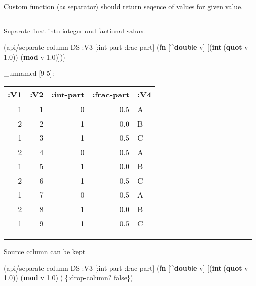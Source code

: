 \documentclass[]{article}
\newenvironment{Shaded}{\begin{snugshade}}{\end{snugshade}}
\newcommand{\KeywordTok}[1]{\textcolor[rgb]{0.13,0.29,0.53}{\textbf{#1}}}
\newcommand{\FloatTok}[1]{\textcolor[rgb]{0.00,0.00,0.81}{#1}}
\newcommand{\VariableTok}[1]{\textcolor[rgb]{0.00,0.00,0.00}{#1}}
\newcommand{\AttributeTok}[1]{\textcolor[rgb]{0.77,0.63,0.00}{#1}}
\newcommand{\NormalTok}[1]{#1}
\begin{document}
Custom function (as separator) should return seqence of values for given
value.

\begin{center}\rule{0.5\linewidth}{0.5pt}\end{center}

Separate float into integer and factional values

\begin{Shaded}
\begin{Highlighting}[]
\NormalTok{(api/separate-column DS }\AttributeTok{:V3}\NormalTok{ [}\AttributeTok{:int-part} \AttributeTok{:frac-part}\NormalTok{] (}\KeywordTok{fn}\NormalTok{ [^}\KeywordTok{double}\NormalTok{ v]}
\NormalTok{                                                     [(}\KeywordTok{int}\NormalTok{ (}\KeywordTok{quot}\NormalTok{ v }\FloatTok{1.0}\NormalTok{))}
\NormalTok{                                                      (}\KeywordTok{mod}\NormalTok{ v }\FloatTok{1.0}\NormalTok{)]))}
\end{Highlighting}
\end{Shaded}

\_unnamed {[}9 5{]}:

\begin{longtable}[]{@{}rrrrl@{}}
\toprule
:V1 & :V2 & :int-part & :frac-part & :V4\tabularnewline
\midrule
\endhead
1 & 1 & 0 & 0.5 & A\tabularnewline
2 & 2 & 1 & 0.0 & B\tabularnewline
1 & 3 & 1 & 0.5 & C\tabularnewline
2 & 4 & 0 & 0.5 & A\tabularnewline
1 & 5 & 1 & 0.0 & B\tabularnewline
2 & 6 & 1 & 0.5 & C\tabularnewline
1 & 7 & 0 & 0.5 & A\tabularnewline
2 & 8 & 1 & 0.0 & B\tabularnewline
1 & 9 & 1 & 0.5 & C\tabularnewline
\bottomrule
\end{longtable}

\begin{center}\rule{0.5\linewidth}{0.5pt}\end{center}

Source column can be kept

\begin{Shaded}
\begin{Highlighting}[]
\NormalTok{(api/separate-column DS }\AttributeTok{:V3}\NormalTok{ [}\AttributeTok{:int-part} \AttributeTok{:frac-part}\NormalTok{] (}\KeywordTok{fn}\NormalTok{ [^}\KeywordTok{double}\NormalTok{ v]}
\NormalTok{                                                     [(}\KeywordTok{int}\NormalTok{ (}\KeywordTok{quot}\NormalTok{ v }\FloatTok{1.0}\NormalTok{))}
\NormalTok{                                                      (}\KeywordTok{mod}\NormalTok{ v }\FloatTok{1.0}\NormalTok{)]) \{}\AttributeTok{:drop-column}\NormalTok{? }\VariableTok{false}\NormalTok{\})}
\end{Highlighting}
\end{Shaded}
\end{document}
